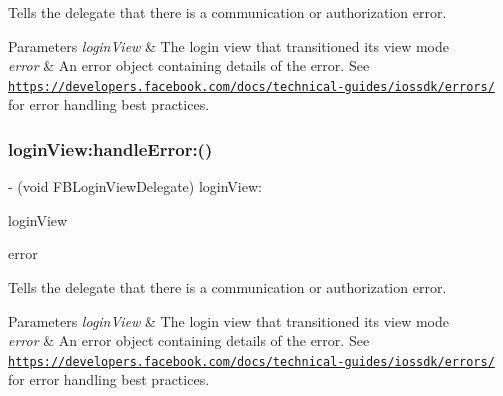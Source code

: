 Tells the delegate that there is a communication or authorization error.


\begin{DoxyParams}{Parameters}
{\em login\+View} & The login view that transitioned its view mode \\
\hline
{\em error} & An error object containing details of the error.  See \href{https://developers.facebook.com/docs/technical-guides/iossdk/errors/}{\tt https\+://developers.\+facebook.\+com/docs/technical-\/guides/iossdk/errors/} for error handling best practices. \\
\hline
\end{DoxyParams}
\mbox{\label{protocolFBLoginViewDelegate_01-p_a4cc27024e9c1fac02fbc65fd6bfba993}} 
\subsubsection{\texorpdfstring{login\+View\+:handle\+Error\+:()}{loginView:handleError:()}\hspace{0.1cm}{\footnotesize\ttfamily [5/5]}}
{\footnotesize\ttfamily -\/ (void F\+B\+Login\+View\+Delegate) login\+View\+: \begin{DoxyParamCaption}\item[{(\hyperlink{interfaceFBLoginView}{F\+B\+Login\+View} $\ast$)}]{login\+View }\item[{handleError:(N\+S\+Error $\ast$)}]{error }\end{DoxyParamCaption}\hspace{0.3cm}{\ttfamily [optional]}}

Tells the delegate that there is a communication or authorization error.


\begin{DoxyParams}{Parameters}
{\em login\+View} & The login view that transitioned its view mode \\
\hline
{\em error} & An error object containing details of the error.  See \href{https://developers.facebook.com/docs/technical-guides/iossdk/errors/}{\tt https\+://developers.\+facebook.\+com/docs/technical-\/guides/iossdk/errors/} for error handling best practices. \\
\hline
\end{DoxyParams}
\mbox{\label{protocolFBLoginViewDelegate_01-p_a6dfcb82e159aa83b726797ec2de6877c}} 

